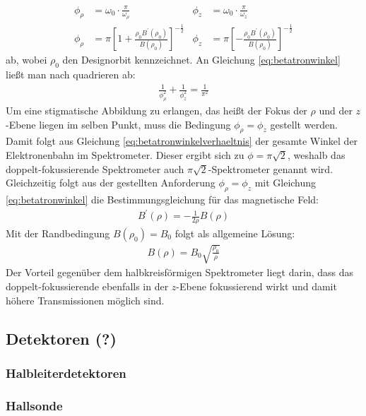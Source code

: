 \documentclass[11pt, a4paper]{article}
\numberwithin{equation}{section}
\begin{document}
\begin{align}
	\phi_\rho &= \omega_0 \cdot \frac{\pi}{\omega_\rho} & \phi_z &= \omega_0 \cdot \frac{\pi}{\omega_z}\\
	\phi_\rho &= \pi \left[ 1+ \frac{\rho_0 B^\prime(\rho_0)}{B(\rho_0)} \right]^{-\frac{1}{2}} & \phi_z &= \pi \left[ -\frac{\rho_0 B^\prime(\rho_0)}{B(\rho_0)} \right]^{-\frac{1}{2}} \label{eq:betatronwinkel}
\end{align}
ab, wobei $\rho_0$ den Designorbit kennzeichnet.
An Gleichung \eqref{eq:betatronwinkel} ließt man nach quadrieren ab:
\begin{align}
	\frac{1}{\phi_\rho^2} + \frac{1}{\phi_z^2} = \frac{1}{\pi^2} \label{eq:betatronwinkelverhaeltnis}
\end{align}
Um eine stigmatische Abbildung zu erlangen, das heißt der Fokus der $\rho$ und der $z$-Ebene liegen im selben Punkt, muss die Bedingung $\phi_\rho = \phi_z$ gestellt werden.
Damit folgt aus Gleichung \eqref{eq:betatronwinkelverhaeltnis} der gesamte Winkel der Elektronenbahn im Spektrometer.
Dieser ergibt sich zu $\phi = \pi \sqrt{2}$, weshalb das doppelt-fokussierende Spektrometer auch $\pi \sqrt{2}$-Spektrometer genannt wird.
Gleichzeitig folgt aus der gestellten Anforderung $\phi_\rho = \phi_z$ mit Gleichung \eqref{eq:betatronwinkel} die Bestimmungsgleichung für das magnetische Feld:
\begin{align}
	B^\prime(\rho) = - \frac{1}{2 \rho} B(\rho)
\end{align}
Mit der Randbedingung $B(\rho_0) = B_0$ folgt als allgemeine Lösung:
\begin{align}
	B(\rho) = B_0 \sqrt{\frac{\rho_0}{\rho}}
\end{align}
Der Vorteil gegenüber dem halbkreisförmigen Spektrometer liegt darin, dass das doppelt-fokussierende ebenfalls in der $z$-Ebene fokussierend wirkt und damit höhere Transmissionen möglich sind.

\subsection{Detektoren (?)}
\subsubsection{Halbleiterdetektoren}

\subsubsection{Hallsonde}
\end{document}
